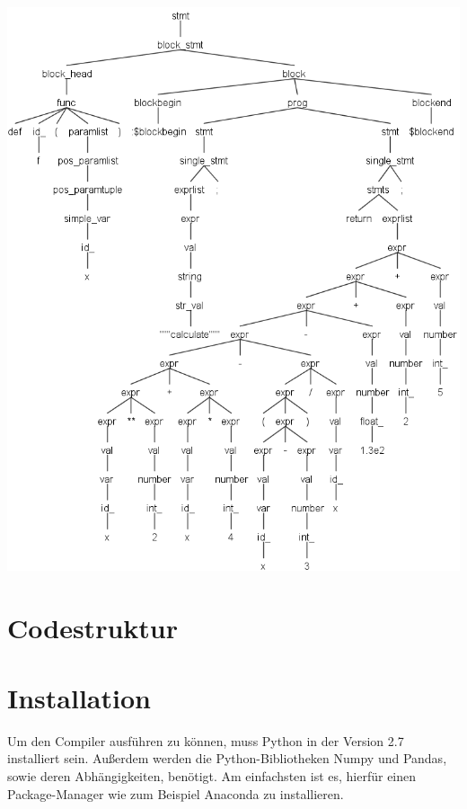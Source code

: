 \begin{center}
 \includegraphics[width=0.8\linewidth]{Bilder/program_func_parse_tree2.png}
\end{center}



\section{Codestruktur}

\appendix
\newpage



\newpage

\section{Installation}

Um den Compiler ausführen zu können, muss Python in der Version 2.7 installiert sein. Außerdem werden die Python-Bibliotheken Numpy und Pandas, sowie deren Abhängigkeiten, benötigt. Am einfachsten ist es, hierfür einen Package-Manager wie zum Beispiel Anaconda zu installieren. \\ \\

